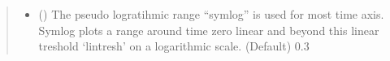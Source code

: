 \documentclass[letterpaper,10pt,english]{sphinxmanual}
\begin{document}
\begin{fulllineitems}
\begin{quote}
\begin{description}
\begin{itemize}
\item {} 
 () \textendash{} The pseudo logratihmic range “symlog” is used for most time axis. Symlog plots a range around
time zero linear and beyond this linear treshold ‘lintresh’ on a logarithmic scale. (Default) 0.3

\end{itemize}

\end{description}\end{quote}

\end{fulllineitems}

\end{document}
